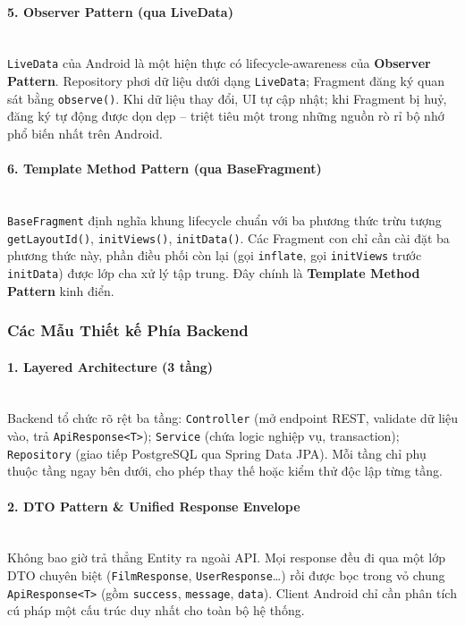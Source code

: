 \paragraph{5. Observer Pattern (qua LiveData)}
\mbox{}\\
\texttt{LiveData} của Android là một hiện thực có lifecycle-awareness của
\textbf{Observer Pattern}. Repository phơi dữ liệu dưới dạng \texttt{LiveData};
Fragment đăng ký quan sát bằng \texttt{observe()}. Khi dữ liệu thay đổi, UI tự
cập nhật; khi Fragment bị huỷ, đăng ký tự động được dọn dẹp -- triệt tiêu một
trong những nguồn rò rỉ bộ nhớ phổ biến nhất trên Android.

\paragraph{6. Template Method Pattern (qua BaseFragment)}
\mbox{}\\
\texttt{BaseFragment} định nghĩa khung lifecycle chuẩn với ba phương thức trừu
tượng \texttt{getLayoutId()}, \texttt{initViews()}, \texttt{initData()}. Các
Fragment con chỉ cần cài đặt ba phương thức này, phần điều phối còn lại (gọi
\texttt{inflate}, gọi \texttt{initViews} trước \texttt{initData}) được lớp cha
xử lý tập trung. Đây chính là \textbf{Template Method Pattern} kinh điển.

\subsubsection{Các Mẫu Thiết kế Phía Backend}

\paragraph{1. Layered Architecture (3 tầng)}
\mbox{}\\
Backend tổ chức rõ rệt ba tầng: \texttt{Controller} (mở endpoint REST, validate
dữ liệu vào, trả \texttt{ApiResponse<T>}); \texttt{Service} (chứa logic nghiệp
vụ, transaction); \texttt{Repository} (giao tiếp PostgreSQL qua Spring Data JPA).
Mỗi tầng chỉ phụ thuộc tầng ngay bên dưới, cho phép thay thế hoặc kiểm thử độc
lập từng tầng.

\paragraph{2. DTO Pattern \& Unified Response Envelope}
\mbox{}\\
Không bao giờ trả thẳng Entity ra ngoài API. Mọi response đều đi qua một lớp DTO
chuyên biệt (\texttt{FilmResponse}, \texttt{UserResponse}\dots) rồi được bọc
trong vỏ chung \texttt{ApiResponse<T>} (gồm \texttt{success}, \texttt{message},
\texttt{data}). Client Android chỉ cần phân tích cú pháp một cấu trúc duy nhất
cho toàn bộ hệ thống.

